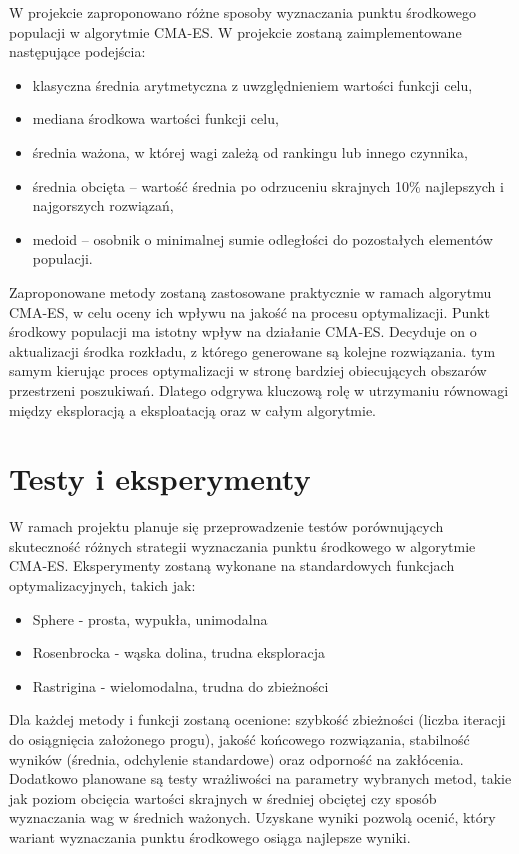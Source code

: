 \documentclass{article}
\begin{document}
W projekcie zaproponowano różne sposoby wyznaczania punktu środkowego populacji w algorytmie CMA-ES. W projekcie zostaną zaimplementowane następujące podejścia:
\begin{itemize}
    \item klasyczna średnia arytmetyczna z uwzględnieniem wartości funkcji celu,
    \item mediana środkowa wartości funkcji celu,
    \item średnia ważona, w której wagi zależą od rankingu lub innego czynnika,
    \item średnia obcięta – wartość średnia po odrzuceniu skrajnych 10\% najlepszych i najgorszych rozwiązań,
    \item medoid – osobnik o minimalnej sumie odległości do pozostałych elementów populacji.
\end{itemize}

Zaproponowane metody zostaną zastosowane praktycznie w ramach algorytmu CMA-ES, w celu oceny ich wpływu na jakość na procesu optymalizacji. Punkt środkowy populacji ma istotny wpływ na działanie CMA-ES. Decyduje on o aktualizacji środka rozkładu, z którego generowane są kolejne rozwiązania. tym samym kierując proces optymalizacji w stronę bardziej obiecujących obszarów przestrzeni poszukiwań. Dlatego odgrywa kluczową rolę w utrzymaniu równowagi między eksploracją a eksploatacją oraz w całym algorytmie.

\section{Testy i eksperymenty}

W ramach projektu planuje się przeprowadzenie testów porównujących skuteczność różnych strategii wyznaczania punktu środkowego w algorytmie CMA-ES. Eksperymenty zostaną wykonane na standardowych funkcjach optymalizacyjnych, takich jak:

\begin{itemize}
    \item Sphere - prosta, wypukła, unimodalna
    \item Rosenbrocka - wąska dolina, trudna eksploracja
    \item Rastrigina - wielomodalna, trudna do zbieżności
\end{itemize} 

Dla każdej metody i funkcji zostaną ocenione: szybkość zbieżności (liczba iteracji do osiągnięcia założonego progu), jakość końcowego rozwiązania, stabilność wyników (średnia, odchylenie standardowe) oraz odporność na zakłócenia. Dodatkowo planowane są testy wrażliwości na parametry wybranych metod, takie jak poziom obcięcia wartości skrajnych w średniej obciętej czy sposób wyznaczania wag w średnich ważonych. Uzyskane wyniki pozwolą ocenić, który wariant wyznaczania punktu środkowego osiąga najlepsze wyniki.
\end{document}
